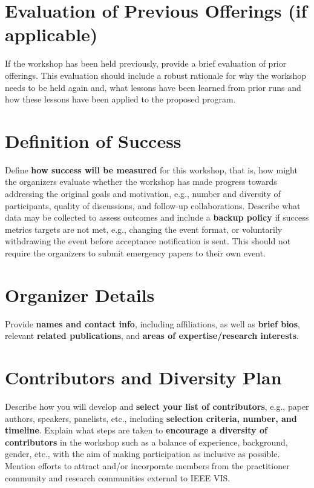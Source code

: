 \documentclass{vgtc}                          %
\begin{document}
\section{Evaluation of Previous Offerings (if applicable)}

If the workshop has been held previously, provide a brief evaluation of prior offerings.
This evaluation should include a robust rationale for why the workshop needs to be held again and, what lessons have been learned from prior runs and how these lessons have been applied to the proposed program.

\section{Definition of Success}

Define \textbf{how success will be measured} for this workshop, that is, how might the organizers evaluate whether the workshop has made progress towards addressing the original goals and motivation, e.g., number and diversity of participants, quality of discussions, and follow-up collaborations.
Describe what data may be collected to assess outcomes and include a \textbf{backup policy} if success metrics targets are not met, e.g., changing the event format, or voluntarily withdrawing the event before acceptance notification is sent. 
This should not require the organizers to submit emergency papers to their own event.

\section{Organizer Details}
Provide \textbf{names and contact info}, including affiliations, as well as \textbf{brief bios}, relevant \textbf{related publications}, and \textbf{areas of expertise/research interests}.


\section{Contributors and Diversity Plan}

Describe how you will develop and \textbf{select your list of contributors}, e.g., paper authors, speakers, panelists, etc., including \textbf{selection criteria, number, and timeline}.
Explain what steps are taken to \textbf{encourage a diversity of contributors} in the workshop such as a balance of experience, background, gender, etc., with the aim of making participation as inclusive as possible.
Mention efforts to attract and/or incorporate members from the practitioner community and research communities external to IEEE VIS.
\end{document}
